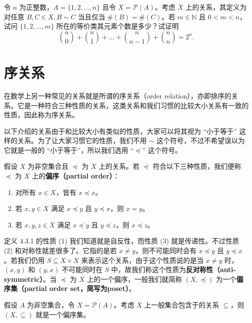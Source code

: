 \begin{question}
令 $n$ 为正整数，$A = \{1, 2, \dots, n\}$ 且令 $X = \mathcal{P}(A)$。考虑 $X$ 上的关系，其定义为对任意 $B, C \in X, B \sim C$ 当且仅当 $\#(B) = \#(C)$。若 $m \in \mathbb{N}$ 且 $0 < m < n$，试问 $\{1, 2, \dots, m\}$ 所在的等价类其元素个数是多少？试证明
$$ \binom{n}{0} + \binom{n}{1} + \dots + \binom{n}{n-1} + \binom{n}{n} = 2^n. $$
\end{question}

\section{序关系}

在数学上另一种常见的关系就是所谓的序关系（order relation），亦即排序的关系。它是一种符合三种性质的关系，这类关系和我们习惯的比较大小关系有一致的性质，因此称为序关系。

以下介绍的关系由于和比较大小有类似的性质，大家可以将其视为 “小于等于” 这样的关系。为了让大家习惯它的性质，我们不用 $\sim$ 这个符号，不过不希望误以为它就是一般的 “小于等于”，所以我们选用 “$\preceq$” 这个符号。

\begin{definition}
假设 $X$ 为非空集合且 $\preceq$ 为 $X$ 上的关系。若 $\preceq$ 符合以下三种性质，我们便称 $\preceq$ 为 $X$ 上的{\bf 偏序（partial order）}：
\begin{enumerate}
    \item 对所有 $x \in X$，皆有 $x \preceq x$。
    \item 若 $x, y \in X$ 满足 $x \preceq y$ 且 $y \preceq x$，则 $x = y$。
    \item 若 $x, y, z \in X$ 满足 $x \preceq y$ 且 $y \preceq z$，则 $x \preceq z$。
\end{enumerate}
\end{definition}

定义 4.3.1 的性质 (1) 我们知道就是自反性，而性质 (3) 就是传递性。不过性质 (2) 和对称性就差很多了。它指的是若 $x \neq y$，则不可能同时会有 $x \preceq y$ 且 $y \preceq x$。若我们仍用 $S \subseteq X \times X$ 来表示这个关系，由于这个性质说的是当 $x \neq y$ 时，$(x, y)$ 和 $(y, x)$ 不可能同时在 $S$ 中，故我们称这个性质为\textbf{反对称性（anti-symmetric）}。当 $\preceq$ 为 $X$ 上的一个偏序，一般我们就简称 $(X, \preceq)$ 为一个\textbf{偏序集（partial order set，简写为poset）}。

\begin{example}
假设 $A$ 为非空集合，令 $X = \mathcal{P}(A)$。考虑 $X$ 上一般集合包含于的关系 $\subseteq$，则 $(X, \subseteq)$ 就是一个偏序集。
\end{example}

